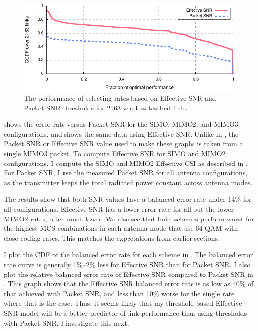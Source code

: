 \begin{figure}[htbp]
  \centering
  \includegraphics[width=\textwidth]{figures/delivery_figures/goodbad/selection_performance.pdf}
  \caption[Performance from selecting rates with Effective SNR and Packet SNR]{The performance of selecting rates based on Effective SNR and Packet SNR thresholds for 2163 wireless testbed links.}
  \label{fig:selection_performance}
\end{figure}


 shows the error rate versus Packet SNR for the SIMO, MIMO2, and MIMO3 configurations, and  shows the same data using Effective SNR. Unlike in , the Packet SNR or Effective SNR value used to make these graphs is taken from a single MIMO3 packet. To compute Effective SNR for SIMO and MIMO2 configurations, I compute the SIMO and MIMO2 Effective CSI as described in . For Packet SNR, I use the measured Packet SNR for all antenna configurations, as the transmitter keeps the total radiated power constant across antenna modes.

The results show that both SNR values have a balanced error rate under 14\% for all configurations. Effective SNR has a lower error rate for all but the lower MIMO2 rates, often much lower. We also see that both schemes perform worst for the highest MCS combinations in each antenna mode that use 64-QAM with close coding rates. This matches the expectations from earlier sections.

I plot the CDF of the balanced error rate for each scheme in . The balanced error rate curve is generally 1\%--2\% less for Effective SNR than for Packet SNR. I also plot the relative balanced error rate of Effective SNR compared to Packet SNR in . This graph shows that the Effective SNR balanced error rate is as low as 40\% of that achieved with Packet SNR, and less than 10\% worse for the single rate where that is the case. Thus, it seems likely that my threshold-based Effective SNR model will be a better predictor of link performance than using thresholds with Packet SNR. I investigate this next.

